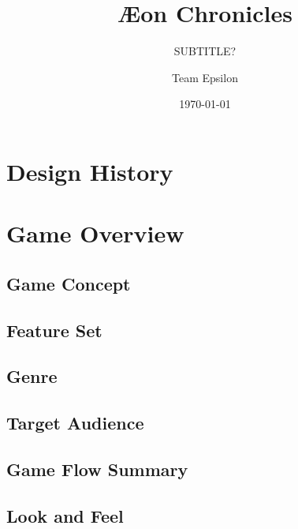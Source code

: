 \documentclass[12pt,titlepage]{article}
\title{\AE on Chronicles}
\subtitle{SUBTITLE?}
\author{Team Epsilon}
\date{\today}
\begin{document}
\maketitle

\tableofcontents


\newpage
\section{Design History}

\newpage
\section{Game Overview}

\subsection{Game Concept}

\subsection{Feature Set}

\subsection{Genre}

\subsection{Target Audience}

\subsection{Game Flow Summary}

\subsection{Look and Feel}
\end{document}
